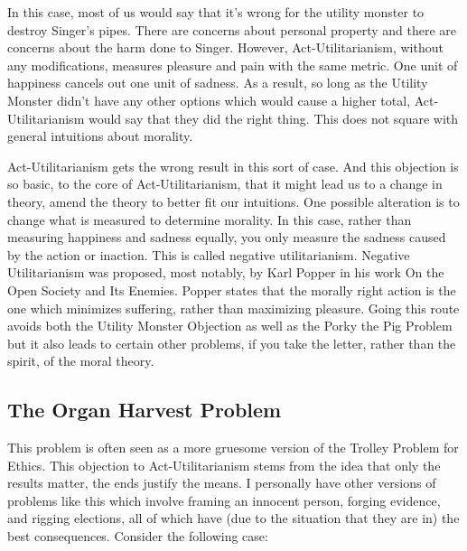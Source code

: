 In this case, most of us would say that it's wrong for the utility monster to destroy Singer's pipes. There are concerns about personal property and there are concerns about the harm done to Singer. However, Act-Utilitarianism, without any modifications, measures pleasure and pain with the same metric. One unit of happiness cancels out one unit of sadness. As a result, so long as the Utility Monster didn't have any other options which would cause a higher total, Act-Utilitarianism would say that they did the right thing. This does not square with general intuitions about morality. 

Act-Utilitarianism gets the wrong result in this sort of case. And this objection is so basic, to the core of Act-Utilitarianism, that it might lead us to a change in theory, amend the theory to better fit our intuitions. One possible alteration is to change what is measured to determine morality. In this case, rather than measuring happiness and sadness equally, you only measure the sadness caused by the action or inaction. This is called negative utilitarianism. Negative Utilitarianism was proposed, most notably, by Karl Popper in his work On the Open Society and Its Enemies. Popper states that the morally right action is the one which minimizes suffering, rather than maximizing pleasure. Going this route avoids both the Utility Monster Objection as well as the Porky the Pig Problem but it also leads to certain other problems, if you take the letter, rather than the spirit, of the moral theory. 

\subsection{The Organ Harvest Problem}

This problem is often seen as a more gruesome version of the Trolley Problem for Ethics. This objection to Act-Utilitarianism stems from the idea that only the results matter, the ends justify the means. I personally have other versions of problems like this which involve framing an innocent person, forging evidence, and rigging elections, all of which have (due to the situation that they are in) the best consequences. Consider the following case:


